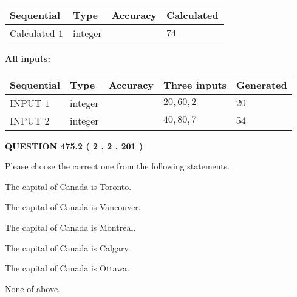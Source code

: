 \documentclass[12pt]{article}
\begin{document}
   
   
   
\noindent{}
   
   
  
  
\noindent\begin{tabular}{|l|l|l|l|}
\hline
 Sequential & Type & Accuracy & Calculated \\ 
\hline
 
 
  Calculated $  1 $ & integer &  & 
  $ 74 $ 
 \\  \hline  
 \end{tabular}
   
   
   
   
\noindent\vspace{0.1in}\hspace{-0.08in} {\textbf{\Large{All inputs: }}}
   
   
  
  
\noindent\begin{tabular}{|l|l|l|l|l|}
\hline
 Sequential & Type & Accuracy & Three inputs & Generated \\ 
\hline
 
 
  INPUT $  1 $ & integer &  & $
 20
 , 
 60
 , 
 2
 $ & $ 20 $ 
 \\  \hline  
 
 
  INPUT $  2 $ & integer &  & $
 40
 , 
 80
 , 
 7
 $ & $ 54 $ 
 \\  \hline  
 \end{tabular}
   
   
  
\vspace{0.2in}
  
{\textbf{\Large{QUESTION
475.2 
 ( 2 , 2 , 201 )
}}}
  
  
Please choose the correct one from the following statements.
 
 
The capital of Canada is Toronto.
 
 
The capital of Canada is Vancouver.
 
 
The capital of Canada is Montreal.
 
 
The capital of Canada is Calgary.
 
 
The capital of Canada is Ottawa.
 
 
 None of above.
 
 
\noindent{}
 
\end{document}
